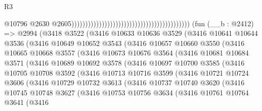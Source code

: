 \begin{lexlean}{R3}
\begin{coremodule}
                                                                                          @10796
                                                                                          @2630
                                                                                          @2605)))))))))))))))))))))))))))))))))))))))))))
    (fun (__b : @2412) =>
    @2994
      (@3418
        @3522
        (@3416
          @10633
          @10636
          @3529
          (@3416
            @10641
            @10644
            @3536
            (@3416
              @10649
              @10652
              @3543
              (@3416
                @10657
                @10660
                @3550
                (@3416
                  @10665
                  @10668
                  @3557
                  (@3416
                    @10673
                    @10676
                    @3564
                    (@3416
                      @10681
                      @10684
                      @3571
                      (@3416
                        @10689
                        @10692
                        @3578
                        (@3416
                          @10697
                          @10700
                          @3585
                          (@3416
                            @10705
                            @10708
                            @3592
                            (@3416
                              @10713
                              @10716
                              @3599
                              (@3416
                                @10721
                                @10724
                                @3606
                                (@3416
                                  @10729
                                  @10732
                                  @3613
                                  (@3416
                                    @10737
                                    @10740
                                    @3620
                                    (@3416
                                      @10745
                                      @10748
                                      @3627
                                      (@3416
                                        @10753
                                        @10756
                                        @3634
                                        (@3416
                                          @10761
                                          @10764
                                          @3641
                                          (@3416

\end{coremodule}
\end{lexlean}
